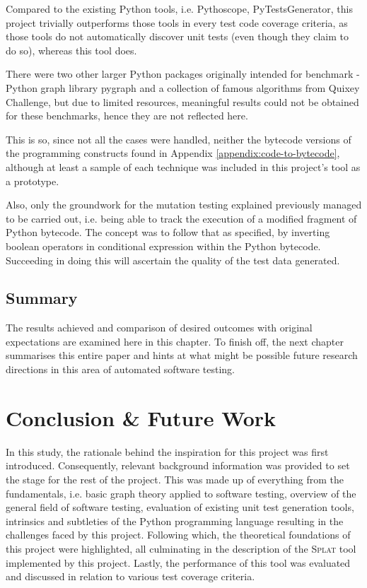 \documentclass{icldt}
\numberwithin{equation}{section}       %
\newcommand{\blankpage}{
\newpage
\thispagestyle{empty}
\mbox{}
\newpage
}
\begin{document}
{{Compared to the existing Python tools, i.e. \textsf{Pythoscope}, \textsf{PyTestsGenerator}, this project trivially outperforms those tools in every test code coverage criteria, as those tools do not automatically discover unit tests (even though they claim to do so), whereas this tool does.

There were two other larger Python packages originally intended for benchmark - Python graph library \textsf{pygraph} and a collection of famous algorithms from Quixey Challenge, but due to limited resources, meaningful results could not be obtained for these benchmarks, hence they are not reflected here.

This is so, since not all the  cases were handled, neither the bytecode versions of the programming constructs found in Appendix \ref{appendix:code-to-bytecode}, although at least a sample of each technique was included in this project's tool as a prototype.

Also, only the groundwork for the mutation testing explained previously managed to be carried out, i.e. being able to track the execution of a modified fragment of Python bytecode. The concept was to follow that as specified, by inverting boolean operators in conditional expression within the Python bytecode. Succeeding in doing this will ascertain the quality of the test data generated.

\section{Summary}
The results achieved and comparison of desired outcomes with original expectations are examined here in this chapter. To finish off, the next chapter summarises this entire paper and hints at what might be possible future research directions in this area of automated software testing.
\blankpage
\chapter{Conclusion \& Future Work}
\label{ch:conclusion}

In this study, the rationale behind the inspiration for this project was first introduced. Consequently, relevant background information was provided to set the stage for the rest of the project. This was made up of everything from the fundamentals, i.e. basic graph theory applied to software testing, overview of the general field of software testing, evaluation of existing unit test generation tools, intrinsics and subtleties of the Python programming language resulting in the challenges faced by this project. Following which, the theoretical foundations of this project were highlighted, all culminating in the description of the \textsc{Splat} tool implemented by this project. Lastly, the performance of this tool was evaluated and discussed in relation to various test coverage criteria.

}}
\end{document}
